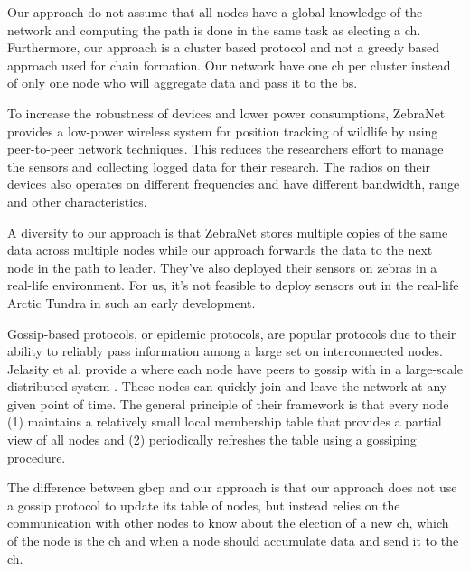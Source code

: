 \documentclass[USenglish]{uit-thesis}
\begin{document}
Our approach do not assume that all nodes have a global knowledge of the network and computing the path is done in the same task as electing a \gls{ch}. Furthermore, our approach is a cluster based protocol and not a greedy based approach used for chain formation. Our network have one \gls{ch} per cluster instead of only one node who will aggregate data and pass it to the \gls{bs}.


To increase the robustness of devices and lower power consumptions, ZebraNet \cite{zebranet} provides a low-power wireless system for position tracking of wildlife by using peer-to-peer network techniques. This reduces the researchers effort to manage the sensors and collecting logged data for their research. The radios on their devices also operates on different frequencies and have different bandwidth, range and other characteristics.

A diversity to our approach is that ZebraNet stores multiple copies of the same data across multiple nodes while our approach forwards the data to the next node in the path to leader. They've also deployed their sensors on zebras in a real-life environment. For us, it's not feasible to deploy sensors out in the real-life Arctic Tundra in such an early development.


Gossip-based protocols, or epidemic protocols, are popular protocols due to their ability to reliably pass information among a large set on interconnected nodes. Jelasity et al. \cite{gbsampling} provide a  where each node have peers to gossip with in a large-scale distributed system \cite{demers}. These nodes can quickly join and leave the network at any given point of time. The general principle of their framework is that every node (1) maintains a relatively small local membership table that provides a partial view of all nodes and (2) periodically refreshes the table using a gossiping procedure.

The difference between \gls{gbcp} and our approach is that our approach does not use a gossip protocol to update its table of nodes, but instead relies on the communication with other nodes to know about the election of a new \gls{ch}, which of the node is the \gls{ch} and when a node should accumulate data and send it to the \gls{ch}.


\end{document}

